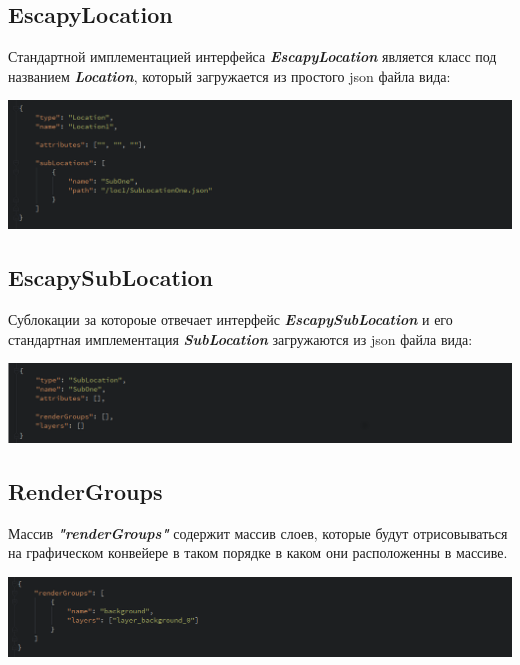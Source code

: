 \documentclass[11pt]{report}
\begin{document}
\newpage
\subsection{EscapyLocation}
Стандартной имплементацией интерфейса \textit{\textbf{EscapyLocation}} является класс под названием \textit{\textbf{Location}}, который загружается из простого json файла вида:
\begin{center}
	\includegraphics[width=1.2\linewidth]{img/17.png} 
  	\label{img:170} 
\end{center} 
\subsection{EscapySubLocation}
Сублокации за котороые отвечает интерфейс \textit{\textbf{EscapySubLocation}} и его стандартная имплементация \textit{\textbf{SubLocation}} загружаются из json файла вида:
\begin{center}
	\includegraphics[width=1.2\linewidth]{img/18.png} 
  	\label{img:180} 
\end{center} 
\subsection{RenderGroups}
Массив \textit{\textbf{"renderGroups"}} содержит массив слоев, которые будут отрисовываться на графическом конвейере в таком порядке в каком они расположенны в массиве. 
\begin{center}
	\includegraphics[width=1.2\linewidth]{img/19.png} 
  	\label{img:190} 
\end{center} 
\end{document}

